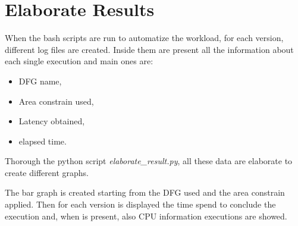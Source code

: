 \chapter{Elaborate Results}
\label{appendix2}

When the bash scripts are run to automatize the workload, for each version, different log files
are created. Inside them are present all the information about each single execution and main ones are:

\begin{itemize}
    \item DFG name,
    \item Area constrain used,
    \item Latency obtained,
    \item elapsed time.
\end{itemize}

Thorough the python script \emph{elaborate\_result.py}, all these data are elaborate to create different graphs.

The bar graph is created starting from the DFG used and the area constrain applied. Then for each version is displayed the time 
spend to conclude the execution and, when is present, also CPU information executions are showed. 

